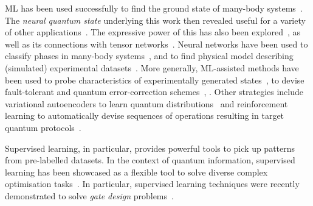 \ac{ML} has been used successfully to find the ground state of many-body systems~\cite{carleo2017solving}. The \emph{neural quantum state} \ansatz underlying this work then revealed useful for a variety of other applications~\cite{torlai2017neural,torlai2017manybody,choo2018symmetries,saito2018method,torlai2018neuralnetwork,torlai2018latent,sharir2019deep,jia2019quantum,levine2019quantum,hartmann2019neuralnetwork,vicentini2019variational,torlai2019integrating,liu2019machine,harney2019entanglement,cui2019directions,carleo2019machine}. The expressive power of this \ansatz has also been explored~\cite{deng2017quantum,gao2017efficient}, as well as its connections with tensor networks~\cite{glasser2018neuralnetwork}.
Neural networks have been used to classify phases in many-body systems~\cite{wang2016discovering,carrasquilla2017machine,van2017learning,deng2017machine,kaubruegger2018chiral,carleo2019machine},
and to find physical model describing (simulated) experimental datasets~\cite{iten2020discovering,nautrup2020operationally}.
More generally, ML-assisted methods have been used to probe characteristics of experimentally generated states~\cite{fujita2018construction,gray2018machinelearningassisted,havlíček2019supervised,canabarro2019machine,agresti2019pattern}, to devise fault-tolerant and quantum error-correction schemes~\cite{liu2019neural}, .
Other strategies include variational autoencoders to learn quantum distributions~\cite{rocchetto2018learning} and reinforcement learning to automatically devise sequences of operations resulting in target quantum protocols~\cite{melnikov2014projective,makmal2016metalearning,melnikov2017projective,melnikov2018benchmarking,melnikov2018active,wallnöfer2019machine,flamini2019photonic}.


Supervised learning, in particular, provides powerful tools to pick up patterns from pre-labelled datasets.
In the context of quantum information, supervised learning has been showcased as a flexible tool to solve diverse complex optimisation tasks~\cite{zdeborov2017machine,carrasquilla2017machine,carleo2017solving,van2017learning,schoenholz2016structural,torlai2017manybody,rocchetto2019experimental,melnikov2018active,fujita2018construction}.
In particular, supervised learning techniques were recently demonstrated to solve \emph{gate design} problems~\cite{banchi2016quantum,innocenti2018supervised,innocenti2018approximate}.

